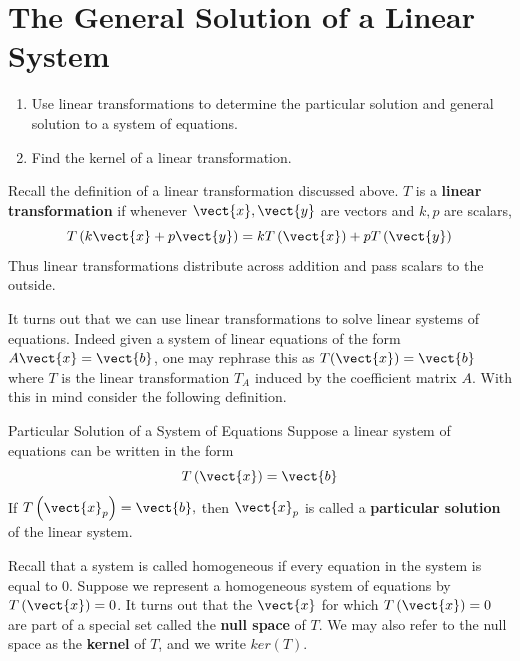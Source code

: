 \section{The General Solution of a Linear System}

\begin{outcome}
\begin{enumerate}
\item[A.]  Use linear transformations to determine the particular solution and general solution to a system of equations.

\item[B.]  Find the kernel of a linear transformation. 
\end{enumerate}
\end{outcome}

Recall the definition of a linear transformation discussed above. 
$T$ is a \textbf{linear transformation} if whenever $\vect{x}, \vect{y}$ are
vectors and $k,p$ are scalars,
\begin{equation*}
T\left( k\vect{x}+p\vect{y}\right) =k T \left( \vect{x} \right) +p T\left(\vect{y} \right)
\end{equation*}
Thus linear transformations distribute across addition and pass scalars to
the outside.

It turns out that we can use linear transformations to solve linear
systems of equations. Indeed given a system of linear equations of the
form $A\vect{x}=\vect{b}$, one may rephrase this as $T(\vect{x})=\vect{b}$ where $T$ is the linear
transformation $T_A$ induced by the coefficient matrix $A$. With this in mind consider the following definition. 

\begin{definition}{Particular Solution of a System of Equations}\label{def:particularsolutions}
Suppose a linear system of equations can be written in the form
\begin{equation*}
T\left(\vect{x}\right)=\vect{b}
\end{equation*}
If $T\left(\vect{x}_{p}\right)=\vect{b},$ 
then $\vect{x}_{p}$ is called a \textbf{particular solution} of
 the linear system.
\end{definition}

Recall that a system is called homogeneous if every equation in the system is equal to $0$. 
Suppose we represent a homogeneous system of equations by $T\left(\vect{x}\right)=0$. It turns out
that the $\vect{x}$ for which $T \left(\vect{x}\right) = 0$ are part of a special set called the \textbf{null space}
of $T$. We may also refer to the null space as the \textbf{kernel} of $T$, and we write $ker\left(T\right)$. 

